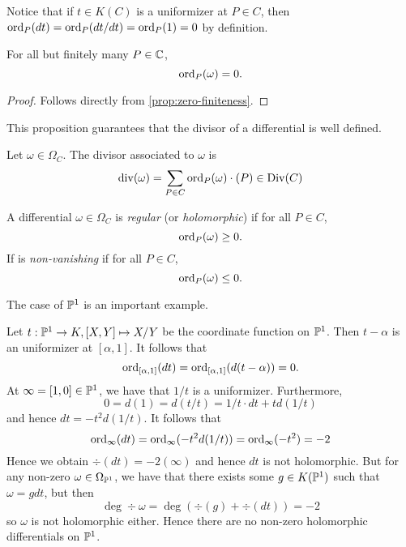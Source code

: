 Notice that if $t \in K(C)$ is a uniformizer at $P \in C$, then
$\operatorname{ord}_P(dt) = \operatorname{ord}_P(dt/dt) = \operatorname{ord}_P(1) = 0$ by definition.

\begin{proposition}
	For all but finitely many $P \in \mathbb{C}$, 
	\begin{equation*}
		\operatorname{ord}_P(\omega) = 0.
	\end{equation*}
\end{proposition}

\begin{proof}
	Follows directly from \ref{prop:zero-finiteness}.
\end{proof}

This proposition guarantees that the divisor of a differential is
well defined.
\begin{definition}
	Let $\omega \in \Omega_C$. The divisor associated to $\omega$ is
	\begin{equation*}
		\operatorname{div}(\omega) = \sum_{P \in C} \operatorname{ord}_P(\omega)\cdot (P) \in \operatorname{Div}(C)
	\end{equation*}
\end{definition}


\begin{definition}
	A differential $\omega \in \Omega_C$ is \emph{regular} 
	(or \emph{holomorphic})
	if for all $P \in C$,
	\begin{equation*}
		\operatorname{ord}_P(\omega) \geq 0.
	\end{equation*}
	If is \emph{non-vanishing} if for all $P \in C$,
	\begin{equation*}
		\operatorname{ord}_P(\omega) \leq 0.
	\end{equation*}
\end{definition}

The case of $\mathbb{P}^1$ is an important example.
\begin{example}
	\label{ex:proj-holomorphic}
	Let $t:\mathbb{P}^1 \to K, [X, Y]\mapsto X/Y$ be the coordinate function on
	$\mathbb{P}^1$. Then $t - \alpha$ is an uniformizer at $[\alpha, 1]$.
	It follows that
	\begin{equation*}
		\operatorname{ord}_{[\alpha, 1]}(dt) = \operatorname{ord}_{[\alpha, 1]}(d(t - \alpha)) = 0.
	\end{equation*}
	At $\infty = [1, 0]\in \mathbb{P}^1$, we have that $1/t$ is a uniformizer.
	Furthermore,
	\begin{equation*}
		0 = d(1) = d(t/t) = 1/t\cdot dt + td(1/t)
	\end{equation*}
	and hence $dt = -t^2d(1/t)$. It follows that 
	\begin{equation*}
		\operatorname{ord}_{\infty}(dt) = \operatorname{ord}_{\infty}(-t^2d(1/t)) = 
		\operatorname{ord}_{\infty}(-t^2) = -2
	\end{equation*}
	Hence we obtain $\div(dt) = -2(\infty)$ and hence $dt$ is not holomorphic.
	But for any non-zero $\omega \in \Omega_{\mathbb{P}^1}$, 
	we have that there exists some $g \in K(\mathbb{P}^1)$ such that 
	$\omega = gdt$, but then
	\begin{equation*}
		\deg\div \omega = \deg(\div(g) + \div(dt)) = -2
	\end{equation*}
	so $\omega$ is not holomorphic either.
	Hence there are no non-zero holomorphic differentials on $\mathbb{P}^1$.
\end{example}

